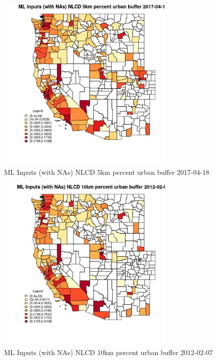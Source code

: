 \begin{figure} 
\centering  
\includegraphics[width=0.77\textwidth]{Code_Outputs/Report_ML_input_PM25_Step4_part_f_de_duplicated_aveswNAs_CountyNLCD_5km_percent_urban_bufferMean2017-04-18.jpg} 
\caption{\label{fig:Report_ML_input_PM25_Step4_part_f_de_duplicated_aveswNAsCountyNLCD_5km_percent_urban_bufferMean2017-04-18}ML Inputs (with NAs) NLCD 5km percent urban buffer 2017-04-18} 
\end{figure} 
 

\begin{figure} 
\centering  
\includegraphics[width=0.77\textwidth]{Code_Outputs/Report_ML_input_PM25_Step4_part_f_de_duplicated_aveswNAs_CountyNLCD_10km_percent_urban_bufferMean2012-02-07.jpg} 
\caption{\label{fig:Report_ML_input_PM25_Step4_part_f_de_duplicated_aveswNAsCountyNLCD_10km_percent_urban_bufferMean2012-02-07}ML Inputs (with NAs) NLCD 10km percent urban buffer 2012-02-07} 
\end{figure} 
 


